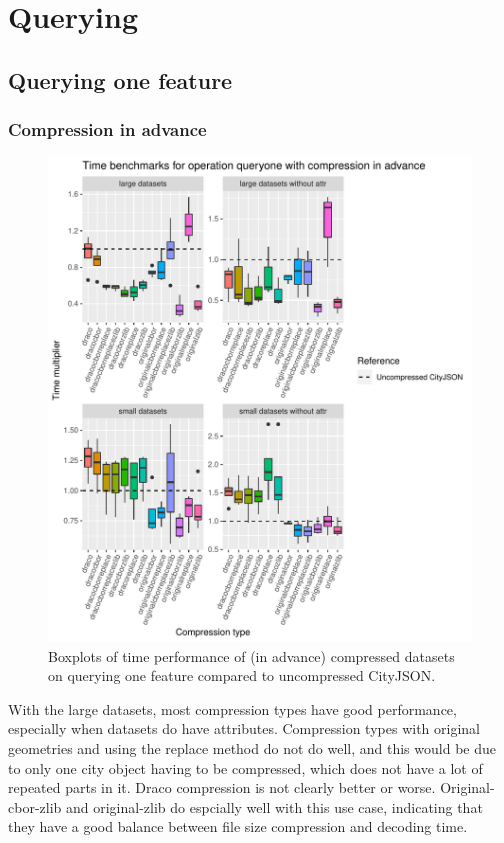 \section{Querying}
\label{bmquerying}

\subsection{Querying one feature}

\subsubsection{Compression in advance}

\begin{figure}[h!]
    \includegraphics[scale=0.92]{figs/benchmark/individual/queryone.pdf}
    \caption{Boxplots of time performance of (in advance) compressed datasets on querying one feature compared to uncompressed CityJSON.}
    \label{fig:sdvis}
\end{figure}

With the large datasets, most compression types have good performance, especially when datasets do have attributes.
Compression types with original geometries and using the replace method do not do well, and this would be due to only one city object having to be compressed, which does not have a lot of repeated parts in it.
Draco compression is not clearly better or worse.
Original-cbor-zlib and original-zlib do espcially well with this use case, indicating that they have a good balance between file size compression and decoding time.

